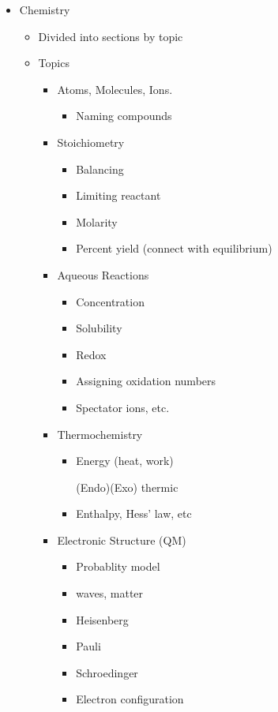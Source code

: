 \documentclass{article}
\begin{document}
	\begin{itemize}
		\item Chemistry
			\begin{itemize}
				\item Divided into sections by topic
				\item Topics 
					\begin{itemize}
						\item Atoms, Molecules, Ions.
							\begin{itemize}
								\item Naming compounds
							\end{itemize}
						\item Stoichiometry
							\begin{itemize}
								\item Balancing
								\item Limiting reactant
								\item Molarity
								\item Percent yield (connect
								with equilibrium)
							\end{itemize}
						\item Aqueous Reactions
							\begin{itemize}
								\item Concentration
								\item Solubility
								\item Redox
								\item Assigning oxidation
								numbers
								\item Spectator ions, etc.
							\end{itemize}
						\item Thermochemistry
							\begin{itemize}
								\item Energy (heat, work) 
								\item [(Endo)(Exo)]thermic
								\item Enthalpy, Hess' law, etc
							\end{itemize}
						\item Electronic Structure (QM)
							\begin{itemize}
								\item Probablity model
								\item waves, matter
								\item Heisenberg
								\item Pauli
								\item Schroedinger
								\item Electron configuration

\end{itemize}
\end{itemize}
\end{itemize}
\end{itemize}
\end{document}
